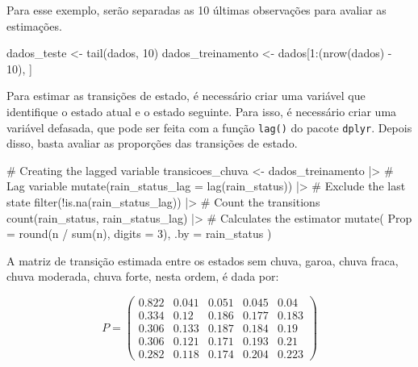 \documentclass[
  letterpaper,
  DIV=11,
  numbers=noendperiod]{scrreprt}
\newenvironment{Shaded}{\begin{snugshade}}{\end{snugshade}}
\newcommand{\AttributeTok}[1]{\textcolor[rgb]{0.40,0.45,0.13}{#1}}
\newcommand{\CommentTok}[1]{\textcolor[rgb]{0.37,0.37,0.37}{#1}}
\newcommand{\DecValTok}[1]{\textcolor[rgb]{0.68,0.00,0.00}{#1}}
\newcommand{\FunctionTok}[1]{\textcolor[rgb]{0.28,0.35,0.67}{#1}}
\newcommand{\NormalTok}[1]{\textcolor[rgb]{0.00,0.23,0.31}{#1}}
\newcommand{\OtherTok}[1]{\textcolor[rgb]{0.00,0.23,0.31}{#1}}
\newcommand{\SpecialCharTok}[1]{\textcolor[rgb]{0.37,0.37,0.37}{#1}}
\begin{document}
Para esse exemplo, serão separadas as 10 últimas observações para
avaliar as estimações.

\begin{Shaded}
\begin{Highlighting}[]
\NormalTok{dados\_teste }\OtherTok{\textless{}{-}} \FunctionTok{tail}\NormalTok{(dados, }\DecValTok{10}\NormalTok{)}
\NormalTok{dados\_treinamento }\OtherTok{\textless{}{-}}\NormalTok{ dados[}\DecValTok{1}\SpecialCharTok{:}\NormalTok{(}\FunctionTok{nrow}\NormalTok{(dados) }\SpecialCharTok{{-}} \DecValTok{10}\NormalTok{), ]}
\end{Highlighting}
\end{Shaded}

Para estimar as transições de estado, é necessário criar uma variável
que identifique o estado atual e o estado seguinte. Para isso, é
necessário criar uma variável defasada, que pode ser feita com a função
\texttt{lag()} do pacote \texttt{dplyr}. Depois disso, basta avaliar as
proporções das transições de estado.

\begin{Shaded}
\begin{Highlighting}[]
\CommentTok{\# Creating the lagged variable}
\NormalTok{transicoes\_chuva }\OtherTok{\textless{}{-}}
\NormalTok{    dados\_treinamento }\SpecialCharTok{|\textgreater{}}
    \CommentTok{\# Lag variable}
    \FunctionTok{mutate}\NormalTok{(}\AttributeTok{rain\_status\_lag =} \FunctionTok{lag}\NormalTok{(rain\_status)) }\SpecialCharTok{|\textgreater{}}
    \CommentTok{\# Exclude the last state}
    \FunctionTok{filter}\NormalTok{(}\SpecialCharTok{!}\FunctionTok{is.na}\NormalTok{(rain\_status\_lag)) }\SpecialCharTok{|\textgreater{}}
    \CommentTok{\# Count the transitions}
    \FunctionTok{count}\NormalTok{(rain\_status, rain\_status\_lag) }\SpecialCharTok{|\textgreater{}}
    \CommentTok{\# Calculates the estimator}
    \FunctionTok{mutate}\NormalTok{(}
        \AttributeTok{Prop =} \FunctionTok{round}\NormalTok{(n }\SpecialCharTok{/} \FunctionTok{sum}\NormalTok{(n), }\AttributeTok{digits =} \DecValTok{3}\NormalTok{),}
        \AttributeTok{.by =}\NormalTok{ rain\_status}
\NormalTok{    )}
\end{Highlighting}
\end{Shaded}

A matriz de transição estimada entre os estados sem chuva, garoa, chuva
fraca, chuva moderada, chuva forte, nesta ordem, é dada por:

\begin{equation}
P =
\begin{pmatrix}
0.822 & 0.041 &  0.051 & 0.045 &  0.04 \\
0.334 & 0.12 &  0.186 & 0.177 &  0.183 \\
0.306 & 0.133 &  0.187 & 0.184 &  0.19 \\
0.306 & 0.121 &  0.171 & 0.193 &  0.21 \\
0.282 & 0.118 &  0.174 & 0.204 &  0.223 
\end{pmatrix}
\end{equation}
\end{document}
